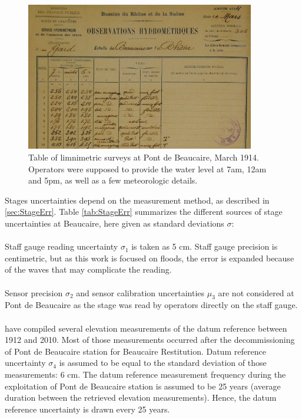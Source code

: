 \documentclass[11pt]{article}
\begin{document}
        \begin{figure}[h]
            \centering
            \includegraphics[width = 10cm]{Figs/4-TabObsBcrSmall.jpg}
            \caption{Table of limnimetric surveys at Pont de Beaucaire, March 1914. Operators were supposed to provide the water level at 7am, 12am and 5pm, as well as a few meteorologic details. \citep{pontschaussees_observations_1914}}
            \label{fig:TabObsPt}
        \end{figure}
        
    Stages uncertainties depend on the measurement method, as described in \ref{sec:StageErr}. Table \ref{tab:StageErr} summarizes the different sources of stage uncertainties at Beaucaire, here given as standard deviations $\sigma$:
        
        \paragraph{}Staff gauge reading uncertainty $\sigma_1$ is taken as 5 cm. Staff gauge precision is centimetric, but as this work is focused on floods, the error is expanded because of the waves that may complicate the reading. 
        
        \paragraph{}Sensor precision $\sigma_2$ and sensor calibration uncertainties $\mu_3$ are not considered at Pont de Beaucaire as the stage was read by operators directly on the staff gauge.
        
        \paragraph{}\citet{bard_actualisation_2018} have compiled several elevation measurements of the datum reference between 1912 and 2010. Most of those measurements occurred after the decommissioning of Pont de Beaucaire station for Beaucaire Restitution. Datum reference uncertainty $\sigma_4$ is assumed to be equal to the standard deviation of those measurements: 6 cm. The datum reference measurement frequency during the exploitation of Pont de Beaucaire station is assumed to be 25 years (average duration between the retrieved elevation measurements). Hence, the datum reference uncertainty is drawn every 25 years.
        
\end{document}
